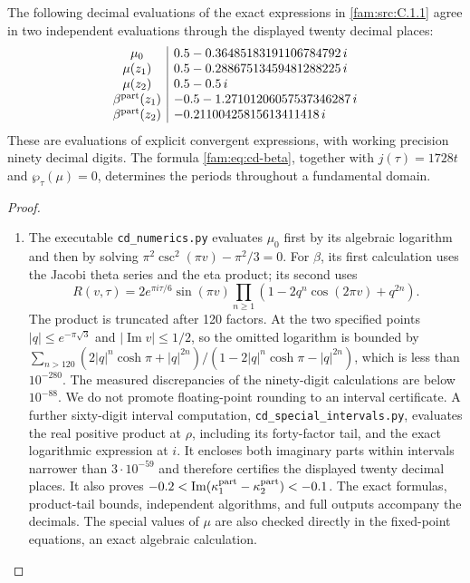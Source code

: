 \begin{proposition}\hypertarget{tag-01QI}{}\label{fam:src:C.1.2}\label{fam:st:C.1.2}

The following decimal evaluations of the exact expressions in \ref{fam:src:C.1.1} agree
in two independent evaluations through the displayed twenty decimal places:
\[
\begin{array}{c|l}
\mu_0&0.5-0.36485183191106784792\,i\\
\mu(z_1)&0.5-0.28867513459481288225\,i\\
\mu(z_2)&0.5-0.5\,i\\
\beta^{\rm part}(z_1)&-0.5-1.27101206057537346287\,i\\
\beta^{\rm part}(z_2)&-0.21100425815613411418\,i
\end{array}
\]
These are evaluations of explicit convergent expressions, with working
precision ninety decimal digits. The formula \eqref{fam:eq:cd-beta}, together
with \(j(\tau)=1728t\) and \(\wp_\tau(\mu)=0\), determines the periods
throughout a fundamental domain.
\end{proposition}


\begin{proof}
\begin{enumerate}[label=\arabic*.,leftmargin=*]
\item The executable \texttt{cd\_numerics.py} evaluates \(\mu_0\) first by its
algebraic logarithm and then by solving
\(\pi^2\csc^2(\pi v)-\pi^2/3=0\). For \(\beta\), its first calculation uses
the Jacobi theta series and the eta product; its second uses
\[
 R(v,\tau)=2e^{\pi i\tau/6}\sin(\pi v)
 \prod_{n\geq1}(1-2q^n\cos(2\pi v)+q^{2n}).
\]
The product is truncated after 120 factors. At the two specified points
\(|q|\leq e^{-\pi\sqrt3}\) and \(|\operatorname{Im}v|\leq1/2\), so the
omitted logarithm is bounded by
\(\sum_{n>120}(2|q|^n\cosh\pi+|q|^{2n})/(1-2|q|^n\cosh\pi-|q|^{2n})\),
which is less than \(10^{-280}\). The measured discrepancies of the
ninety-digit calculations are below \(10^{-88}\). We do not promote floating-point rounding to an interval certificate.
A further sixty-digit interval computation, \texttt{cd\_special\_intervals.py},
evaluates the real positive product at $\rho$, including its forty-factor
tail, and the exact logarithmic expression at $i$. It encloses both
imaginary parts within intervals narrower than $3\cdot10^{-59}$ and
therefore certifies the displayed twenty decimal places. It also proves
$-0.2<\operatorname{Im}(\kappa_1^{\rm part}-\kappa_2^{\rm part})<-0.1$.
The exact formulas, product-tail bounds, independent algorithms, and
full outputs accompany the decimals. The special values of \(\mu\) are also checked directly in
the fixed-point equations, an exact algebraic calculation.
\end{enumerate}
\end{proof}

